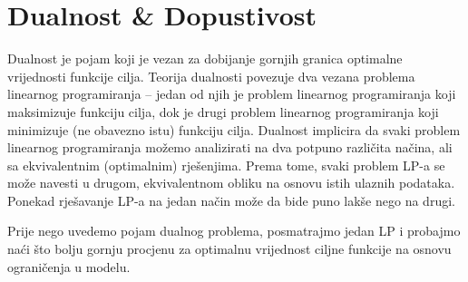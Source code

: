 \documentclass[a4paper, utf8, 11pt, colorlinks]{book}
\begin{document}

  \newpage
 \chapter{Dualnost \& Dopustivost}
 
 Dualnost je pojam koji je vezan za dobijanje gornjih granica optimalne vrijednosti funkcije cilja. Teorija dualnosti povezuje dva vezana problema linearnog programiranja -- jedan od njih je problem linearnog programiranja koji maksimizuje funkciju cilja, dok je drugi problem linearnog programiranja koji minimizuje (ne obavezno istu) funkciju cilja.  Dualnost implicira da svaki problem linearnog programiranja možemo analizirati na dva potpuno različita načina, ali sa ekvivalentnim (optimalnim) rješenjima.   
  Prema tome, svaki problem LP-a se može navesti u drugom, ekvivalentnom obliku na osnovu istih ulaznih podataka. Ponekad rješavanje LP-a na jedan način može da bide puno lakše nego na drugi.
 
 
 
 Prije nego uvedemo pojam dualnog problema, posmatrajmo jedan LP i probajmo naći što bolju gornju procjenu za optimalnu vrijednost ciljne funkcije na osnovu ograničenja u modelu.
 
\end{document}
